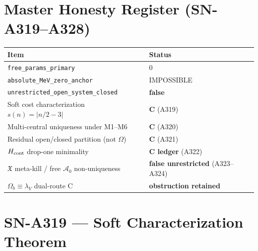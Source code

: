 
\section*{Master Honesty Register (SN-A319--A328)}
\begin{center}
\begin{tabular}{@{}p{7.4cm}p{5.0cm}@{}}
\toprule
\textbf{Item} & \textbf{Status} \\
\midrule
\texttt{free\_params\_primary} & $0$ \\
\texttt{absolute\_MeV\_zero\_anchor} & IMPOSSIBLE \\
\texttt{unrestricted\_open\_system\_closed} & \textbf{false} \\
Soft cost characterization $s(n)=|n/2-3|$ & \textbf{C} (A319) \\
Multi-central uniqueness under M1--M6 & \textbf{C} (A320) \\
Residual open/closed partition (not $\Omega$) & \textbf{C} (A321) \\
$H_{\rm cont}$ drop-one minimality & \textbf{C ledger} (A322) \\
$\mathfrak{X}$ meta-kill / free $\mathcal{A}_0$ non-uniqueness & \textbf{false unrestricted} (A323--A324) \\
$\Omega_b\equiv\lambda_V$ dual-route C & \textbf{obstruction retained} \\
\bottomrule
\end{tabular}
\end{center}

\section{SN-A319 --- Soft Characterization Theorem}
\label{sec:SN-A319}

